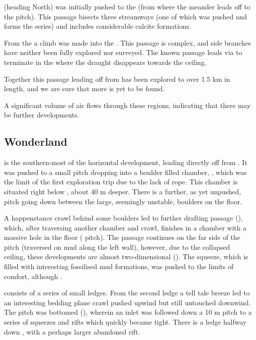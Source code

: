 \textbf{} (heading North) was initially pushed to the  (from where the  meander leads off to the  pitch). This passage bisects three streamways (one of which was pushed and forms the  series) and includes considerable calcite formations.

From the  a climb was made into the \textbf{}. This passage is complex, and side branches have neither
been fully explored nor surveyed. The known passage leads via  to terminate in the  where the draught disappears towards the ceiling.

Together this passage leading off from  has been explored to over 1.5 km in length, and we are sure that more is yet to be found.

A significant volume of air flows through these regions, indicating that there may be further developments.


\subsection{Wonderland}

 is the southern-most of the horizontal development,
leading directly off from . It was pushed to a small pitch
dropping into a boulder filled chamber, , which was
the limit of the first exploration trip due to the lack of rope. This
chamber is situated right below , about 40 m deeper. There is a
further, as yet unpushed, pitch going down between the large, seemingly unstable, boulders on the floor.

A happenstance crawl behind some boulders led to further drafting
passage (), which, after traversing another
chamber and crawl, finishes in a chamber with a massive hole in the
floor ( pitch). The passage continues on the far side of
the pitch (traversed on mud along the left wall), however, due to the
collapsed ceiling, these developments are almost two-dimensional
(). The squeeze, which is filled with interesting
fossilised mud formations, was pushed to the limits of comfort, although
.

 consists of a series of small ledges. From the second
ledge a tell tale breeze led to an interesting bedding plane crawl
pushed upwind but still untouched downwind. The pitch was bottomed (), wherein an inlet was followed down a 10 m pitch to a series of
squeezes and rifts which quickly became tight. There is a ledge halfway
down , with a perhaps larger abandoned rift.

